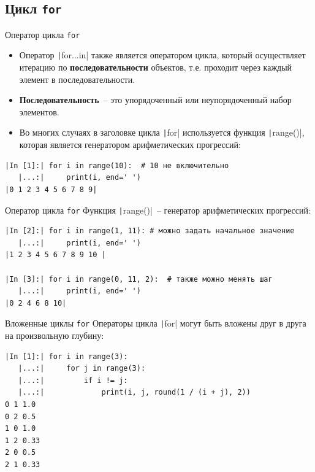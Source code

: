 \documentclass[aspectratio=169]{beamer}	%
\begin{document}
\subsection{Цикл \texttt{for}}
\scriptsize
\begin{frame}[fragile]{Оператор цикла \texttt{for}}
	\begin{itemize}
		\item Оператор \texttt|for...in| также является оператором цикла, который осуществляет итерацию по \textcolor{extraorange}{\textbf{последовательности}} объектов, т.е. проходит через каждый элемент в последовательности.
		
		\item \textcolor{extraorange}{\textbf{Последовательность}}~-- это упорядоченный или неупорядоченный набор элементов.
		
		\item Во многих случаях в заголовке цикла \texttt|for| используется функция \texttt|range()|, которая является генератором арифметических прогрессий:
	\end{itemize}

\begin{verbatim}
|In [1]:| for i in range(10):  # 10 не включительно
   |...:|     print(i, end=' ')
|0 1 2 3 4 5 6 7 8 9|
\end{verbatim}
\vfill
\end{frame}


\begin{frame}[fragile]{Оператор цикла \texttt{for}}
\scriptsize
Функция \texttt|range()|~-- генератор арифметических прогрессий:

\begin{verbatim}
|In [2]:| for i in range(1, 11): # можно задать начальное значение
   |...:|     print(i, end=' ')
|1 2 3 4 5 6 7 8 9 10 |

|In [3]:| for i in range(0, 11, 2):  # также можно менять шаг
   |...:|     print(i, end=' ')
|0 2 4 6 8 10|
\end{verbatim}
\vfill
\end{frame}


\begin{frame}[fragile]{Вложенные циклы \texttt{for}}
\scriptsize
Операторы цикла \texttt|for| могут быть вложены друг в друга на произвольную глубину:

\begin{verbatim}
|In [1]:| for i in range(3):
   |...:|     for j in range(3):
   |...:|         if i != j:
   |...:|             print(i, j, round(1 / (i + j), 2))
0 1 1.0
0 2 0.5
1 0 1.0
1 2 0.33
2 0 0.5
2 1 0.33
\end{verbatim}
\vfill
\end{frame}
\end{document}
